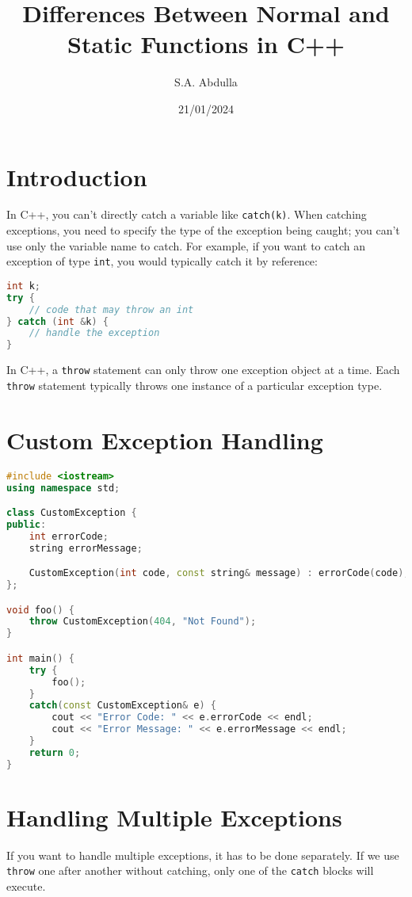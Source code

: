 \documentclass{article}
\title{Differences Between Normal and Static Functions in C++}
\author{S.A. Abdulla}
\date{21/01/2024}
\begin{document}
\maketitle

\newpage
\section*{Introduction}
In C++, you can't directly catch a variable like \texttt{catch(k)}. 
When catching exceptions, you need to specify the type of the exception being caught;
you can't use only the variable name to catch.
\newline
For example, if you want to catch an exception of type \texttt{int},
you would typically catch it by reference:

\begin{lstlisting}[language=C++, caption=Example of catching an int exception]
int k;
try {
    // code that may throw an int
} catch (int &k) {
    // handle the exception
}
\end{lstlisting}

In C++, a \texttt{throw} statement can only throw one exception object at a time. Each \texttt{throw} statement typically throws one instance of a particular exception type.

\section*{Custom Exception Handling}
\begin{lstlisting}[language=C++, caption=Example of custom exception handling]
#include <iostream>
using namespace std;

class CustomException {
public:
    int errorCode;
    string errorMessage;

    CustomException(int code, const string& message) : errorCode(code), errorMessage(message) {}
};

void foo() {
    throw CustomException(404, "Not Found");
}

int main() {
    try {
        foo();
    }
    catch(const CustomException& e) {
        cout << "Error Code: " << e.errorCode << endl;
        cout << "Error Message: " << e.errorMessage << endl;
    }
    return 0;
}
\end{lstlisting}
\newpage

\section*{Handling Multiple Exceptions}
If you want to handle multiple exceptions, it has to be done separately. If we use \texttt{throw} one after another without catching, only one of the \texttt{catch} blocks will execute.
\end{document}
